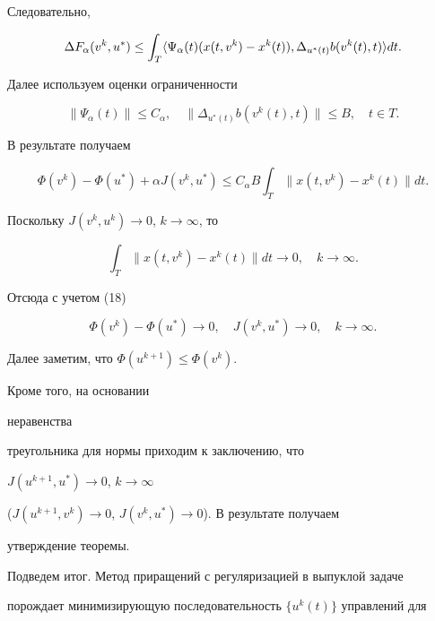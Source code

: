 \begin{pf}
Следовательно, 


$$ 


\Delta F_\alpha(v^k,u^*)\le\int_T\la\Psi_\alpha(t) 


(x(t,v^k)-x^k(t)),\Delta_{u^*(t)}b(v^k(t),t)\ra dt. 


$$ 


Далее используем оценки ограниченности 


$$ 


\|\Psi_\alpha(t)\|\le C_\alpha,\quad 


\|\Delta_{u^*(t)}b(v^k(t),t)\|\le B,\quad t\in T. 


$$ 


В результате получаем 


\begin{equation} 


\Phi(v^k)-\Phi(u^*)+\alpha J(v^k,u^*)\le C_\alpha B 


\int_T\|x(t,v^k)-x^k(t)\|dt. 


\end{equation} 


Поскольку $J(v^k,u^k)\to 0$, $k\to\infty$, то 


$$ 


\int_T\|x(t,v^k)-x^k(t)\|dt\to 0,\quad k\to\infty. 


$$ 


Отсюда с учетом (18) 


$$ 


\Phi(v^k)-\Phi(u^*)\to 0,\quad J(v^k,u^*)\to 0,\quad k\to\infty. 


$$ 


Далее заметим, что $\Phi(u^{k+1})\le\Phi(v^k)$. 


Кроме того, на основании 


неравенства 


треугольника для нормы приходим к заключению, что 


$J(u^{k+1},u^*)\to 0$, $k\to \infty$ 


($J(u^{k+1},v^k)\to 0$, $J(v^k,u^*)\to 0$). В результате получаем 


утверждение теоремы. 


\end{pf} 


 


Подведем итог. Метод приращений с регуляризацией в выпуклой задаче 


порождает минимизирующую последовательность $\{u^k(t)\}$ управлений для 



